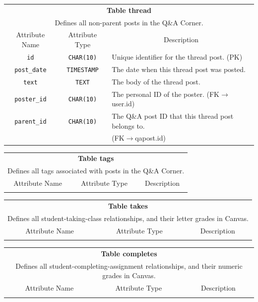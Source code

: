 \documentclass{paper}
\begin{document}
\begin{center}
		\begin{tabular}{c | c | l}
			\toprule
			\multicolumn{3}{c}{\textbf{Table thread}} \\
			\multicolumn{3}{c}{Defines all non-parent posts in the Q\&A Corner.}\\
			\midrule
			Attribute Name & Attribute Type & \multicolumn{1}{c}{Description} \\
			\verb|id| & \verb|CHAR(10)| & Unique identifier for the thread post. (PK) \\
			\verb|post_date| & \verb|TIMESTAMP| & The date when this thread post was posted.\\
			\verb|text| & \verb|TEXT| & The body of the thread post.\\
			\verb|poster_id| & \verb|CHAR(10)| & The personal ID of the poster. (FK$\to$user.id)\\
			\verb|parent_id| & \verb|CHAR(10)| & The Q\&A post ID that this thread post belongs to.\\
			& & (FK$\to$qapost.id)\\
			\bottomrule
		\end{tabular}\vspace{1.5em}
			
		\begin{tabular}{c | c | l}
			\toprule
			\multicolumn{3}{c}{\textbf{Table tags}} \\
			\multicolumn{3}{c}{Defines all tags associated with posts in the Q\&A Corner.}\\
			\midrule
			Attribute Name & Attribute Type & \multicolumn{1}{c}{Description} \\
			\verb|| & \verb|| &  \\
			\bottomrule
		\end{tabular}\vspace{1.5em}
			
		\begin{tabular}{c | c | l}
			\toprule
			\multicolumn{3}{c}{\textbf{Table takes}} \\
			\multicolumn{3}{c}{Defines all student-taking-class relationships, and their letter grades in Canvas.}\\
			\midrule
			Attribute Name & Attribute Type & \multicolumn{1}{c}{Description} \\
			&  &  \\
			\bottomrule
		\end{tabular}\vspace{1.5em}
			
		\begin{tabular}{c | c | l}
			\toprule
			\multicolumn{3}{c}{\textbf{Table completes}} \\
			\multicolumn{3}{c}{Defines all student-completing-assignment relationships, and their numeric grades in Canvas.}\\
			\midrule
			Attribute Name & Attribute Type & \multicolumn{1}{c}{Description} \\
			&  &  \\
			\bottomrule
		\end{tabular}\vspace{1.5em}
	

\end{center}
\end{document}
